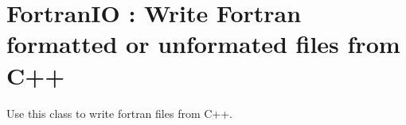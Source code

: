 \section{FortranIO : Write Fortran formatted or unformated files from C++}

Use this class to write fortran files from C++.



